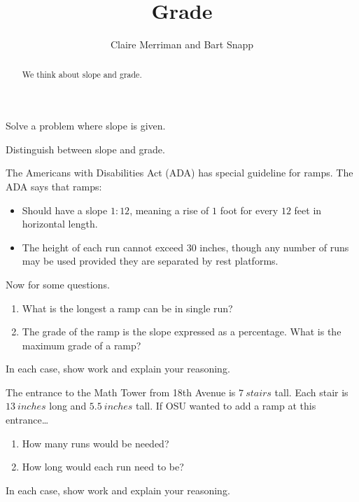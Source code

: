 \documentclass[noauthor,nooutcomes,hints,handout]{ximera}
\title{Grade}
\author{Claire Merriman and Bart Snapp}
\begin{document}
\begin{abstract}
  We think about slope and grade.
\end{abstract}
\maketitle

\begin{listOutcomes}
\item Solve a problem where slope is given.
\item Distinguish between slope and grade.
\end{listOutcomes}
\mynewpage

\begin{question}
  The Americans with Disabilities Act (ADA) has special guideline for
  ramps. The ADA says that ramps:
  \begin{itemize}
  \item Should have a slope $1:12$, meaning a rise of $1$ foot for
    every $12$ feet in horizontal length.
  \item The height of each run cannot exceed $30$ inches, though any
    number of runs may be used provided they are separated by rest
    platforms.
  \end{itemize}
  Now for some questions.
\begin{enumerate}
 \item What is the longest a ramp can be in single run?
 \item The grade of the ramp is the slope expressed as a percentage. What is the maximum grade of a ramp?
\end{enumerate}
In each case, show work and explain your reasoning. 

\end{question}

\mynewpage

\begin{question}
The entrance to the Math Tower from 18th Avenue is $7\ stairs$
tall. Each stair is $13\ inches$ long and $5.5\ inches$ tall. If OSU
wanted to add a ramp at this entrance\dots
\begin{enumerate}
\item How many runs would be needed?
\item How long would each run need to be? 
\end{enumerate}
 In each case, show work and explain your reasoning.
\end{question}

\mynewpage
\end{document}
